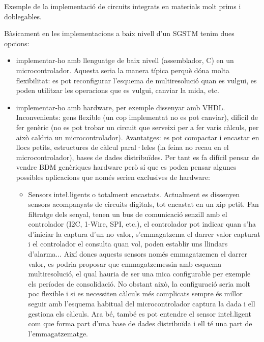 Exemple de la implementació de circuits integrats en materials molt prims i doblegables.




Bàsicament en les implementacions a baix nivell d'un SGSTM tenim dues opcions:

\begin{itemize}
\item implementar-ho amb llenguatge de baix nivell (assemblador, C) en un microcontrolador. Aquesta seria la manera típica perquè dóna molta flexibilitat: es pot reconfigurar l'esquema de multiresolució quan es vulgui, es poden utilitzar les operacions que es vulgui, canviar la mida, etc. 

\item implementar-ho amb hardware, per exemple dissenyar amb
  VHDL. Inconvenients: gens flexible (un cop implementat no es pot
  canviar), difícil de fer genèric (no es pot trobar un circuit que
  serveixi per a fer varis càlculs, per això caldria un
  microcontrolador). Avantatges: es pot compactar i encastar en
  llocs petits, estructures de càlcul paral·leles (la feina no recau
  en el microcontrolador), bases de dades distribuïdes. Per tant es fa
  difícil pensar de vendre BDM genèriques hardware però sí que es
  poden pensar algunes possibles aplicacions que només serien
  exclusives de hardware:

  \begin{itemize}
  \item Sensors inte\l.ligents o totalment encastats. Actualment es
    dissenyen sensors acompanyats de circuits digitals, tot encastat
    en un xip petit. Fan filtratge dels senyal, tenen un bus de
    comunicació senzill amb el controlador (I2C, 1-Wire, SPI, etc.), el
    controlador pot indicar quan s'ha d'iniciar la captura d'un no
    valor, s'emmagatzema el darrer valor capturat i el controlador el
    consulta quan vol, poden establir uns llindars d'alarma... Així
    doncs aquests sensors només emmagatzemen el darrer valor, es
    podria proposar que emmagatzemessin amb esquema multiresolució, el
    qual hauria de ser una mica configurable per exemple els períodes
    de consolidació. No obstant això, la configuració seria molt poc
    flexible i si es necessiten càlculs més complicats sempre és
    millor seguir amb l'esquema habitual del microcontrolador captura
    la dada i ell gestiona els càlculs. Ara bé, també es pot entendre
    el sensor inte\l.ligent com que forma part d'una base de dades
    distribuïda i ell té una part de l'emmagatzematge.
    

\end{itemize}
\end{itemize}
